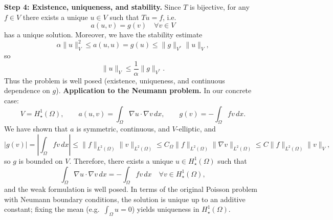 \textbf{Step 4: Existence, uniqueness, and stability.}
Since $T$ is bijective, for any $f\in V$ there exists a unique $u\in V$ such that $T u = f$, i.e.
\[
    a(u,v) = g(v) \quad\forall v\in V
\]
has a unique solution.
Moreover, we have the stability estimate
\[
    \alpha \|u\|_V^2 \le a(u,u) = g(u) \le \|g\|_{V^\ast}\|u\|_V,
\]
so
\[
    \|u\|_V \le \frac{1}{\alpha}\|g\|_{V^\ast}.
\]
Thus the problem is well posed (existence, uniqueness, and continuous dependence on $g$).
\textbf{Application to the Neumann problem.}
In our concrete case:
\[
    V = H^1_\star(\Omega),\qquad
    a(u,v) = \int_\Omega \nabla u \cdot \nabla v\,dx,\qquad
    g(v) = -\int_\Omega f v\,dx.
\]
We have shown that $a$ is symmetric, continuous, and $V$-elliptic, and
\[
    |g(v)| = \left|\int_\Omega f v\,dx\right|
    \le \|f\|_{L^2(\Omega)}\|v\|_{L^2(\Omega)}
    \le C_\Omega \|f\|_{L^2(\Omega)}\|\nabla v\|_{L^2(\Omega)}
    \le C \|f\|_{L^2(\Omega)} \|v\|_V,
\]
so $g$ is bounded on $V$.
Therefore, there exists a unique $u \in H^1_\star(\Omega)$ such that
\[
    \int_\Omega \nabla u \cdot \nabla v\,dx = -\int_\Omega f v\,dx
    \quad \forall v \in H^1_\star(\Omega),
\]
and the weak formulation is well posed. In terms of the original Poisson problem with Neumann boundary conditions, the solution is unique up to an additive constant; fixing the mean (e.g.\ $\int_\Omega u = 0$) yields uniqueness in $H^1_\star(\Omega)$.
